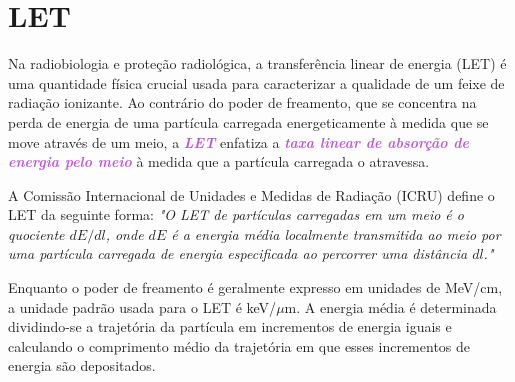 \documentclass[11pt,a4paper]{article}
\begin{document}
\section{LET}

	Na radiobiologia e proteção radiológica, a transferência linear de energia (LET) é uma quantidade física crucial usada para caracterizar a qualidade de um feixe de radiação ionizante. Ao contrário do poder de freamento, que se concentra na perda de energia de uma partícula carregada energeticamente à medida que se move através de um meio, a \textcolor{MediumOrchid}{\textbf{\textit{LET}}} enfatiza a \textcolor{MediumOrchid}{\textbf{\textit{taxa linear de absorção de energia pelo meio}}} à medida que a partícula carregada o atravessa.

	A Comissão Internacional de Unidades e Medidas de Radiação (ICRU) define o LET da seguinte forma: \textit{"O LET de partículas carregadas em um meio é o quociente $dE/dl$, onde $dE$ é a energia média localmente transmitida ao meio por uma partícula carregada de energia especificada ao percorrer uma distância $dl$."}

	Enquanto o poder de freamento é geralmente expresso em unidades de MeV/cm, a unidade padrão usada para o LET é keV/$\mu$m. A energia média é determinada dividindo-se a trajetória da partícula em incrementos de energia iguais e calculando o comprimento médio da trajetória em que esses incrementos de energia são depositados.

	\
\end{document}
